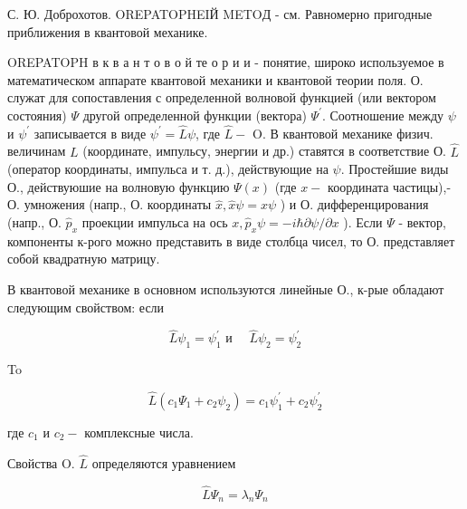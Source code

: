 \documentclass[10pt]{article}
\begin{document}
С. Ю. Доброхотов. OREPATOPHEIЙ METOД - см. Равномерно пригодные приближения в квантовой механике.



OREPATOPH в к в а н т о в о й те о р и и - понятие, широко используемое в математическом аппарате квантовой механики и квантовой теории поля. О. служат для сопоставления с определенной волновой функцией (или вектором состояния) $\Psi$ другой определенной функции (вектора) $\Psi^{\prime}$. Соотношение между $\psi$ и $\psi^{\prime}$ записывается в виде $\psi^{\prime}=\hat{L} \psi$, где $\hat{L}-$ O. В квантовой механике физич. величинам $L$ (координате, импульсу, энергии и др.) ставятся в соответствие О. $\hat{L}$ (оператор координаты, импульса и т. д.), действующие на $\psi$. Простейшие виды О., действуюшие на волновую функцию $\Psi(x)$ (где $x-$ координата частицы),- О. умножения (напр., О. координаты $\hat{x}, \hat{x} \psi=x \psi$ ) и О. дифференцирования (напр., О. $\hat{p}_{x}$ проекции импульса на ось $x, \hat{p}_{x} \psi=-i \hbar \partial \psi / \partial x$ ). Если $\Psi$ - вектор, компоненты к-рого можно представить в виде столбца чисел, то О. представляет собой квадратную матрицу.



В квантовой механике в основном используются линейные О., к-рые обладают следующим свойством: если



\[

\hat{L} \psi_{1}=\psi_{1}^{\prime} \text { и } \quad \hat{L} \psi_{2}=\psi_{2}^{\prime}

\]



To



\[

\hat{L}\left(c_{1} \Psi_{1}+c_{2} \psi_{2}\right)=c_{1} \psi_{1}^{\prime}+c_{2} \psi_{2}^{\prime}

\]



где $c_{1}$ и $c_{2}-$ комплексные числа.



Свойства O. $\hat{L}$ определяются уравнением



\[

\hat{L} \Psi_{n}=\lambda_{n} \Psi_{n}

\]
\end{document}
